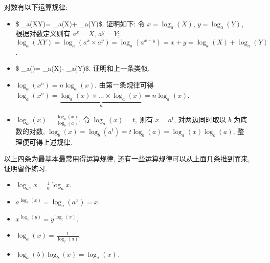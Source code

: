 对数有以下运算规律:

\begin{itemize}
\tightlist
\item
  \$ \log\_a(XY)= \log\_a(X)+ \log\_a(Y)\$. 证明如下: 令
  \(x=\log_a(X)\), \(y=\log_a(Y)\), 根据对数定义则有 \(a^x=X\),
  \(a^y=Y\);
  \(\log_a(XY)=\log_a(a^x\times a^y)=\log_a(a^{x+y})=x+y=\log_a(X)+ \log_a(Y)\).
\item
  \$ \log\_a\left(\right)= \log\_a(X)- \log\_a(Y)\$.
  证明和上一条类似.
\item
  \(\log_a(x^n)=n\log_a(x)\). 由第一条规律可得
  \(\log_a(x^n)=\underbrace{\log_a(x)\times...\times\log_a(x)}_{n}=n\log_a(x)\).
\item
  \(\log_a(x)=\frac{\log_b(x)}{\log_b(a)}\). 令 \(\log_a(x)=t\), 则有
  \(x=a^t\), 对两边同时取以 \(b\) 为底数的对数,
  \(\log_b(x)=\log_b(a^t)=t\log_b(a)=\log_a(x)\log_b(a)\),
  整理便可得上述规律.
\end{itemize}

以上四条为最基本最常用得运算规律,
还有一些运算规律可以从上面几条推到而来, 证明留作练习.

\begin{itemize}
\tightlist
\item
  \(\log_{a^n}x=\frac{1}{n}\log_{a}x\).
\item
  \(a^{\log_a(x)}=\log_a(a^x)=x\).
\item
  \(x^{\log_a(y)}=y^{\log_a(x)}\).
\item
  \(\log_a(x)=\frac{1}{\log_x(a)}\).
\item
  \(\log_a(b)\log_b(x)=\log_a(x)\).
\end{itemize}
